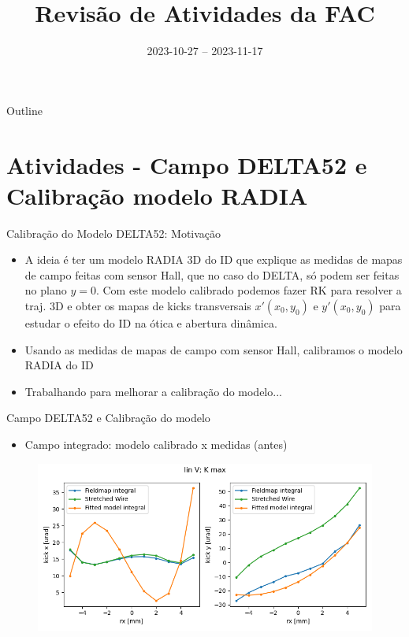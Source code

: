 \documentclass{beamer}					  %
\title{Revisão de Atividades da FAC}	%
\institute{LNLS.DAC.FAC}				%
\date{2023-10-27 -- 2023-11-17}			%
\begin{document}
\begin{frame}
  \titlepage
  \href{https://github.com/lnls-fac/doc-review-dac-fac}{}
  \href{https://www.overleaf.com/read/sbdjxtzfchrm}{}
\end{frame}

\begin{frame}{Outline}
  \tableofcontents
\end{frame}


\section{Atividades - Campo DELTA52 e Calibração modelo RADIA}

\begin{frame}{Calibração do Modelo DELTA52: Motivação}
    \begin{itemize}
		\item A ideia é ter um modelo RADIA 3D do ID que explique as medidas de mapas de campo feitas com sensor Hall, que no caso do DELTA, só podem ser feitas no plano $y = 0$. Com este modelo calibrado podemos fazer RK para resolver a traj. 3D e obter os mapas de kicks transversais $x'(x_0, y_0)$ e $y'(x_0, y_0)$ para estudar o efeito do ID na ótica e abertura dinâmica.
        \item Usando as medidas de mapas de campo com sensor Hall, calibramos o modelo RADIA do ID
        \item Trabalhando para melhorar a calibração do modelo...
	\end{itemize}
\end{frame}

\begin{frame}{Campo DELTA52 e Calibração do modelo}
\begin{itemize}
        \item Campo integrado: modelo calibrado x medidas (antes)
	\end{itemize}
\begin{figure}[H]
		\centering
        \includegraphics[width=.9\textwidth]{2023-10-27/figures/field_integrals_fitting.png}
        \label{fig:integral_fitting}
    \end{figure}
\end{frame}
\end{document}
